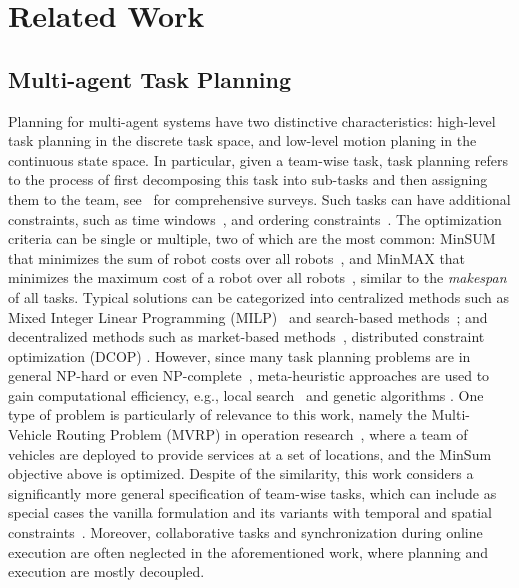 \section{Related Work}\label{sec:related-work}




\subsection{Multi-agent Task Planning}\label{subsec:multi-tamp}
Planning for multi-agent systems have two distinctive characteristics:
high-level task planning in the discrete task space,
and low-level motion planing in the continuous state space.
In particular,
given a team-wise task, task planning refers to the process of first decomposing this task into sub-tasks
and then assigning them to the team, see~\citep{torreno2017cooperative,gini2017multi} for comprehensive surveys.
Such tasks can have additional constraints,
such as time windows~\citep{luo2015distributed},
and ordering constraints~\citep{nunes2015multi}.
The optimization criteria can be single or multiple,
two of which are the most common:
MinSUM that minimizes the sum of robot costs over all robots~\citep{gini2017multi, luo2015distributed},
and MinMAX that minimizes the maximum cost of a robot over all robots~\citep{nunes2015multi},
similar to the \emph{makespan} of all tasks.
Typical solutions can be categorized into centralized methods such as
Mixed Integer Linear Programming (MILP)~\citep{torreno2017cooperative} and search-based methods~\citep{toth2002overview};
and decentralized methods such as
market-based methods~\citep{luo2015distributed}, distributed constraint optimization (DCOP) \citep{nunes2015multi}.
However, since many task planning problems are in general NP-hard or even NP-complete~\citep{hochba1997approximation},
meta-heuristic approaches are used to gain computational efficiency,
e.g., local search~\citep{hoos2004stochastic} and genetic algorithms \citep{khamis2015multi}.
One type of problem is particularly of relevance to this work,
namely the Multi-Vehicle Routing Problem (MVRP) in operation research~\citep{gini2017multi},
where a team of vehicles are deployed to provide services at a set of locations,
and the MinSum objective above is optimized.
Despite of the similarity,
this work considers a significantly more general specification of team-wise tasks,
which can include as special cases the vanilla formulation and its variants with
temporal and spatial constraints~\citep{nunes2015multi}.
Moreover, collaborative tasks and synchronization during online execution are often neglected in the aforementioned work, where planning and execution are mostly decoupled.

